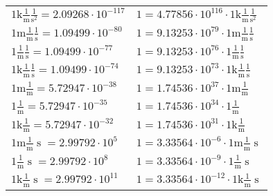 \begin{center}
\begin{longtable}{l l}
{\color{gray}$1 \bm{\mathrm{ k}}\frac1{\operatorname{m}}\frac1{\operatorname{s}^2}{}{} = 2.09268\cdot10^{-117} $}   & {\color{gray}$ 1 = 4.77856\cdot10^{116} \cdot 1 \bm{\mathrm{ k}}\frac1{\operatorname{m}}\frac1{\operatorname{s}^2}{}{}$}  \\
{\color{gray}$1 \bm{\mathrm{ m}}\frac1{\operatorname{m}}\frac1{\operatorname{s}}{}{} = 1.09499\cdot10^{-80} $}   & {\color{gray}$ 1 = 9.13253\cdot10^{79} \cdot 1 \bm{\mathrm{ m}}\frac1{\operatorname{m}}\frac1{\operatorname{s}}{}{}$}  \\
{\color{black}$1 \bm{\mathrm{ }}\frac1{\operatorname{m}}\frac1{\operatorname{s}}{}{} = 1.09499\cdot10^{-77} $}   & {\color{black}$ 1 = 9.13253\cdot10^{76} \cdot 1 \bm{\mathrm{ }}\frac1{\operatorname{m}}\frac1{\operatorname{s}}{}{}$}  \\
{\color{gray}$1 \bm{\mathrm{ k}}\frac1{\operatorname{m}}\frac1{\operatorname{s}}{}{} = 1.09499\cdot10^{-74} $}   & {\color{gray}$ 1 = 9.13253\cdot10^{73} \cdot 1 \bm{\mathrm{ k}}\frac1{\operatorname{m}}\frac1{\operatorname{s}}{}{}$}  \\
{\color{gray}$1 \bm{\mathrm{ m}}\frac1{\operatorname{m}}{}{}{} = 5.72947\cdot10^{-38} $}   & {\color{gray}$ 1 = 1.74536\cdot10^{37} \cdot 1 \bm{\mathrm{ m}}\frac1{\operatorname{m}}{}{}{}$}  \\
{\color{black}$1 \bm{\mathrm{ }}\frac1{\operatorname{m}}{}{}{} = 5.72947\cdot10^{-35} $}   & {\color{black}$ 1 = 1.74536\cdot10^{34} \cdot 1 \bm{\mathrm{ }}\frac1{\operatorname{m}}{}{}{}$}  \\
{\color{gray}$1 \bm{\mathrm{ k}}\frac1{\operatorname{m}}{}{}{} = 5.72947\cdot10^{-32} $}   & {\color{gray}$ 1 = 1.74536\cdot10^{31} \cdot 1 \bm{\mathrm{ k}}\frac1{\operatorname{m}}{}{}{}$}  \\
{\color{gray}$1 \bm{\mathrm{ m}}\frac1{\operatorname{m}}{\operatorname{s}}{}{} = 2.99792\cdot10^{5} $}   & {\color{gray}$ 1 = 3.33564\cdot10^{-6} \cdot 1 \bm{\mathrm{ m}}\frac1{\operatorname{m}}{\operatorname{s}}{}{}$}  \\
{\color{black}$1 \bm{\mathrm{ }}\frac1{\operatorname{m}}{\operatorname{s}}{}{} = 2.99792\cdot10^{8} $}   & {\color{black}$ 1 = 3.33564\cdot10^{-9} \cdot 1 \bm{\mathrm{ }}\frac1{\operatorname{m}}{\operatorname{s}}{}{}$}  \\
{\color{gray}$1 \bm{\mathrm{ k}}\frac1{\operatorname{m}}{\operatorname{s}}{}{} = 2.99792\cdot10^{11} $}   & {\color{gray}$ 1 = 3.33564\cdot10^{-12} \cdot 1 \bm{\mathrm{ k}}\frac1{\operatorname{m}}{\operatorname{s}}{}{}$}  \\

\end{longtable}
\end{center}
